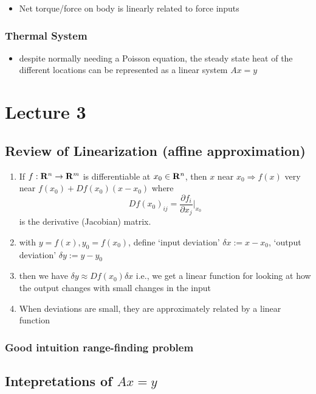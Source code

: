 \documentclass[10pt,letterpaper]{article}
\begin{document}
\begin{itemize}
\item Net torque/force on body is linearly related to force inputs
\end{itemize}
\subsubsection{Thermal System}
\label{sec-1_2_3}

\begin{itemize}
\item despite normally needing a Poisson equation, the steady state heat of the different locations can be represented as a linear system $Ax=y$
\end{itemize}
\section{Lecture 3}
\label{sec-2}
\subsection{Review of Linearization (affine approximation)}
\label{sec-2_1}

  \begin{enumerate}
  \item  If $f: {\bf R}^{n} \rightarrow {\bf R}^{m} $ is differentiable at $x_{0} \in {\bf R} ^{n}$, then
  $x$ near $x_{0} \Rightarrow f(x)$ very near $f(x_{0}) + D f(x_{0})(x-x_{0})$
  where
  $$
  Df(x_{0})_{ij}= \frac{\partial f_{i}}{\partial x_{j}} \bigg|_{x_{0}}
  $$
  is the derivative (Jacobian) matrix.
  
  \item with $y=f(x), y_{0}=f(x_{0})$, define `input deviation' $\delta x := x-x_{0}$, `output deviation' $\delta y:= y-y_{0}$
  \item then we have $\delta y \approx Df(x_{0})\delta x$
  \subitem i.e., we get a linear function for looking at how the output changes with small changes in the input
  \item When deviations are small, they are approximately related by a linear function
  
  \end{enumerate}
\subsubsection{Good intuition range-finding problem}
\label{sec-2_1_1}
\subsection{Intepretations of $Ax=y$}
\label{sec-2_2}
\end{document}
